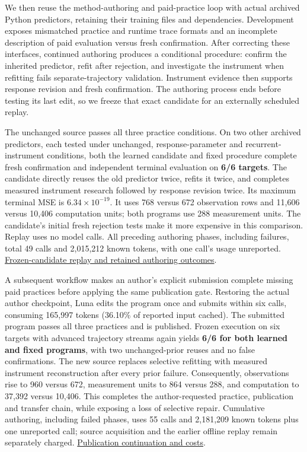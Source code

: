 \documentclass[11pt,a4paper]{article}
\begin{document}
We then reuse the method-authoring and paid-practice loop with actual archived
Python predictors, retaining their training files and dependencies. Development
exposes mismatched practice and runtime trace formats and an incomplete description
of paid evaluation versus fresh confirmation. After correcting these interfaces,
continued authoring produces a conditional procedure: confirm the inherited
predictor, refit after rejection, and investigate the instrument when refitting
fails separate-trajectory validation. Instrument evidence then supports response
revision and fresh confirmation. The authoring process ends before testing its
last edit, so we freeze that exact candidate for an externally scheduled replay.


The unchanged source passes all three practice conditions. On two other archived
predictors, each tested under unchanged, response-parameter and recurrent-instrument
conditions, both the learned candidate and fixed procedure complete fresh
confirmation and independent terminal evaluation on \textbf{6/6 targets}. The candidate
directly reuses the old predictor twice, refits it twice, and completes measured
instrument research followed by response revision twice. Its maximum terminal
MSE is \(6.34\times10^{-19}\). It uses 768 versus 672 observation rows and 11,606
versus 10,406 computation units; both programs use 288 measurement units. The
candidate's initial fresh rejection tests make it more expensive in this comparison.
Replay uses no model calls. All preceding authoring phases, including failures,
total 49 calls and 2,015,212 known tokens, with one call's usage unreported.
\hyperlink{artifact-87}{Frozen-candidate replay and retained authoring outcomes}.


A subsequent workflow makes an author's explicit submission complete missing paid
practices before applying the same publication gate. Restoring the actual author
checkpoint, Luna edits the program once and submits within six calls, consuming
165,997 tokens (36.10\% of reported input cached). The submitted program passes all
three practices and is published. Frozen execution on six targets with advanced
trajectory streams again yields \textbf{6/6 for both learned and fixed programs}, with
two unchanged-prior reuses and no false confirmations. The new source replaces
selective refitting with measured instrument reconstruction after every prior
failure. Consequently, observations rise to 960 versus 672, measurement units to
864 versus 288, and computation to 37,392 versus 10,406. This completes the
author-requested practice, publication and transfer chain, while exposing a loss
of selective repair. Cumulative authoring, including failed phases, uses 55 calls
and 2,181,209 known tokens plus one unreported call; source acquisition and the
earlier offline replay remain separately charged.
\hyperlink{artifact-88}{Publication continuation and costs}.
\end{document}
